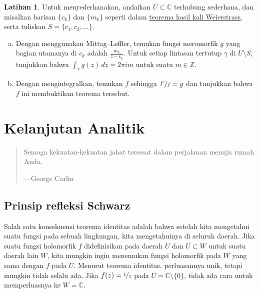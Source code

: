 \documentclass[12pt,openany]{book}
\newcommand{\C}{{\mathbb{C}}}
\newcommand{\Z}{{\mathbb{Z}}}
\theoremstyle{plain}
\theoremstyle{remark}
\theoremstyle{definition}
\newenvironment{exbox}{%
    \def\FrameCommand{\vrule width 1pt \relax\hspace{10pt}}%
    \MakeFramed{\advance\hsize-\width\FrameRestore}%
}{%
    \endMakeFramed
}
\newenvironment{exparts}{%
    \leavevmode\begin{enumerate}[a),noitemsep,topsep=0pt,parsep=0pt,partopsep=0pt]
}{%
    \end{enumerate}
}
\newenvironment{myepigraph}{%
    \begin{quote}%
    \begingroup\itshape
}{%
    \endgroup%
    \end{quote}
}
\theoremstyle{exercise}
\newtheorem{exercise}{Latihan}[section]
\theoremstyle{example}
\begin{document}
\begin{exbox}
\begin{exercise}
Untuk menyederhanakan, andaikan $U \subset \C$ terhubung sederhana, dan misalkan
barisan
$\{c_k\}$ dan $\{m_k\}$ seperti dalam
\hyperref[thm:weierprod]{teorema hasil kali Weierstrass}, serta tuliskan
$S = \{ c_1,c_2,\ldots \}$.
\begin{exparts}
\item
Dengan menggunakan Mittag--Leffler,
temukan fungsi meromorfik $g$ yang bagian utamanya di $c_k$ adalah $\frac{m_k}{z-c_k}$.
Untuk setiap lintasan tertutup $\gamma$ di $U \setminus S$, tunjukkan bahwa
$\int_\gamma g(z)\, dz = 2\pi i m$ untuk suatu $m \in \Z$.
\item
Dengan mengintegralkan, temukan $f$ sehingga $\nicefrac{f'}{f} = g$ dan tunjukkan bahwa $f$ ini membuktikan teorema tersebut.
\end{exparts}
\end{exercise}
\end{exbox}


\chapter{Kelanjutan Analitik} \label{ch:analcont}

\begin{myepigraph}
Semoga kekuatan-kekuatan jahat tersesat dalam perjalanan menuju rumah Anda.

---George Carlin
\end{myepigraph}


\section{Prinsip refleksi Schwarz}

Salah satu konsekuensi teorema identitas adalah bahwa setelah kita mengetahui suatu
fungsi pada sebuah lingkungan, kita mengetahuinya di seluruh daerah.
Jika suatu fungsi holomorfik $f$ didefinisikan pada
daerah $U$ dan $U \subset W$ untuk suatu daerah lain $W$,
kita mungkin ingin menemukan fungsi holomorfik pada $W$ yang sama dengan
$f$ pada $U$.  Menurut teorema identitas, perluasannya unik, tetapi mungkin tidak
selalu ada.  Jika $f(z) =
\nicefrac{1}{z}$ pada $U = \C \setminus \{ 0 \}$, tidak ada cara
untuk memperluasnya ke $W = \C$.
\end{document}

